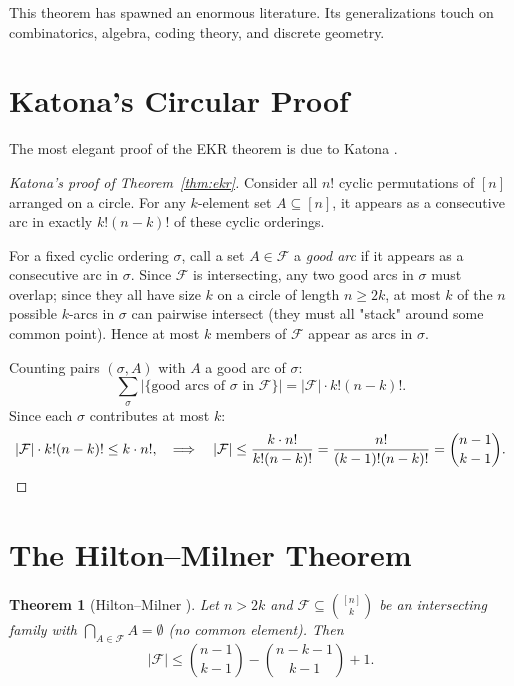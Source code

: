 \documentclass[12pt,a4paper]{amsart}
\newtheorem{theorem}{Theorem}[section]
\theoremstyle{definition}
\theoremstyle{remark}
\begin{document}
This theorem has spawned an enormous literature. Its generalizations touch on
combinatorics, algebra, coding theory, and discrete geometry.

\section{Katona's Circular Proof}\label{sec:katona}

The most elegant proof of the EKR theorem is due to Katona \cite{Katona1972}.

\begin{proof}[Katona's proof of Theorem~\ref{thm:ekr}]
Consider all $n!$ cyclic permutations of $[n]$ arranged on a circle. For any
$k$-element set $A \subseteq [n]$, it appears as a consecutive arc in exactly $k!(n-k)!$
of these cyclic orderings.

For a fixed cyclic ordering $\sigma$, call a set $A \in \mathcal{F}$ a \emph{good arc}
if it appears as a consecutive arc in $\sigma$. Since $\mathcal{F}$ is intersecting,
any two good arcs in $\sigma$ must overlap; since they all have size $k$ on a circle
of length $n \geq 2k$, at most $k$ of the $n$ possible $k$-arcs in $\sigma$ can
pairwise intersect (they must all "stack" around some common point). Hence at most $k$
members of $\mathcal{F}$ appear as arcs in $\sigma$.

Counting pairs $(\sigma, A)$ with $A$ a good arc of $\sigma$:
\[
  \sum_\sigma |\{\text{good arcs of } \sigma \text{ in } \mathcal{F}\}|
  = |\mathcal{F}| \cdot k!(n-k)!.
\]
Since each $\sigma$ contributes at most $k$:
\[
  |\mathcal{F}| \cdot k!(n-k)! \leq k \cdot n!,
  \quad\Longrightarrow\quad
  |\mathcal{F}| \leq \frac{k \cdot n!}{k!(n-k)!} = \frac{n!}{(k-1)!(n-k)!} = \binom{n-1}{k-1}.
\qedhere\]
\end{proof}

\section{The Hilton--Milner Theorem}\label{sec:hilton_milner}

\begin{theorem}[Hilton--Milner \cite{HiltonMilner1967}]\label{thm:hilton_milner}
Let $n > 2k$ and $\mathcal{F} \subseteq \binom{[n]}{k}$ be an intersecting family
with $\bigcap_{A \in \mathcal{F}} A = \emptyset$ (no common element). Then
\[
  |\mathcal{F}| \leq \binom{n-1}{k-1} - \binom{n-k-1}{k-1} + 1.
\]
\end{theorem}
\end{document}
